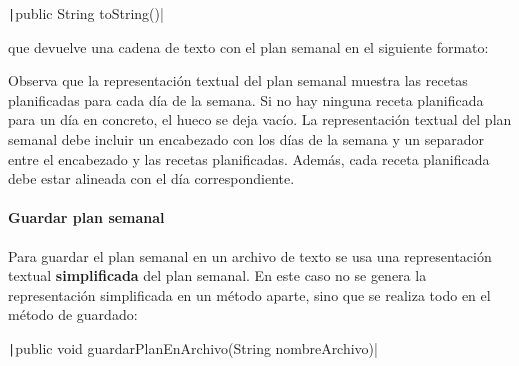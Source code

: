 \documentclass[
    a4paper, %
    12pt, %
]{CSSullivanBusinessReport}
\begin{document}
\texttt|public String toString()|

que devuelve una cadena de texto con el plan semanal en el siguiente formato:

\begin{fullwidth}
\end{fullwidth}

Observa que la representación textual del plan semanal muestra las recetas planificadas para cada día de la semana. Si no hay ninguna receta planificada para un día en concreto, el hueco se deja vacío. La representación textual del plan semanal debe incluir un encabezado con los días de la semana y un separador entre el encabezado y las recetas planificadas. Además, cada receta planificada debe estar alineada con el día correspondiente.

\paragraph{Guardar plan semanal}

Para guardar el plan semanal en un archivo de texto se usa una representación textual \textbf{simplificada} del plan semanal. En este caso no se genera la representación simplificada en un método aparte, sino que se realiza todo en el método de guardado:

\texttt|public void guardarPlanEnArchivo(String nombreArchivo)|
\end{document}

